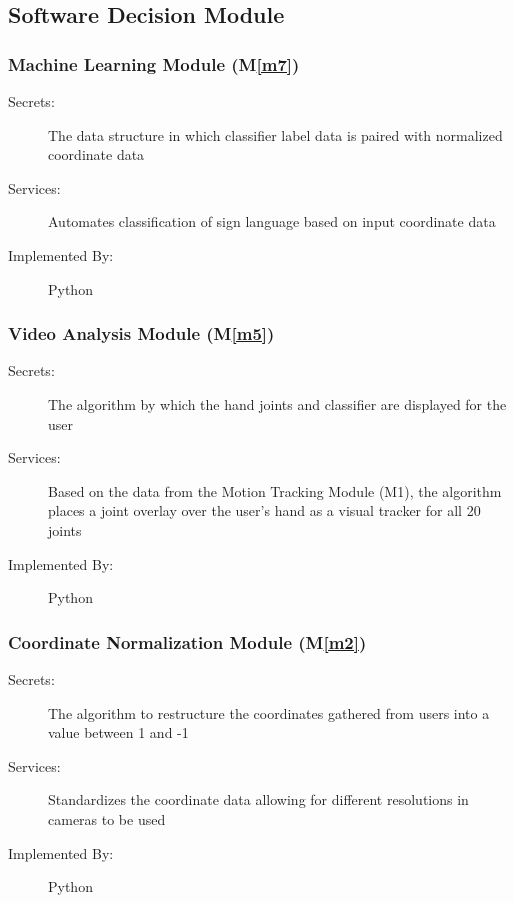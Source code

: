 \documentclass[12pt, titlepage]{article}
\newcommand{\mref}[1]{M\ref{#1}}
\begin{document}
\subsection{Software Decision Module}

\subsubsection{Machine Learning Module (\mref{m7})}

\begin{description}
  \item[Secrets:] The data structure in which classifier label data is paired with normalized coordinate data
  \item[Services:] Automates classification of sign language based on input coordinate data
  \item[Implemented By:] Python
  \end{description}
  

\subsubsection{Video Analysis Module (\mref{m5})}

\begin{description}
  \item[Secrets:] The algorithm by which the hand joints and classifier are displayed for the user
  \item[Services:] Based on the data from the Motion Tracking Module (M1), the algorithm places a joint overlay over the user’s hand as a visual tracker for all 20 joints
  \item[Implemented By:] Python
  \end{description}
  


\subsubsection{Coordinate Normalization Module (\mref{m2})}

\begin{description}
  \item[Secrets:] The algorithm to restructure the coordinates gathered from users into a value between 1 and -1
  \item[Services:] Standardizes the coordinate data allowing for different resolutions in cameras to be used
  \item[Implemented By:] Python
  \end{description}
  
\end{document}
